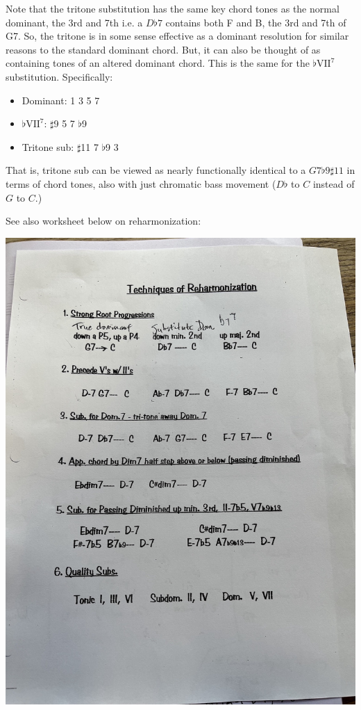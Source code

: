 \documentclass[10pt,a4paper]{article}
\begin{document}
Note that the tritone substitution has the same key chord tones as the normal dominant, the 3rd and 7th i.e. a $D\flat 7$ contains both F and B, the 3rd and 7th of G7. So, the tritone is in some sense effective as a dominant resolution for similar reasons to the standard dominant chord. But, it can also be thought of as containing tones of an altered dominant chord. This is the same for the $\flat\text{VII}^7$ substitution. Specifically:
\begin{itemize}
    \item Dominant: 1 3 5 7
    \item $\flat\text{VII}^7$: $\sharp$9 5 7 $\flat$9 
    \item Tritone sub: $\sharp$11 7 $\flat$9 3
\end{itemize}
That is, tritone sub can be viewed as nearly functionally identical to a $G7 \flat 9 \sharp 11$ in terms of chord tones, also with just chromatic bass movement ($D \flat$ to $C$ instead of $G$ to $C$.)

See also worksheet below on reharmonization:
\begin{center}
\includegraphics[scale=0.15]{reharmonization_techniques.jpg}
\end{center}
\end{document}
